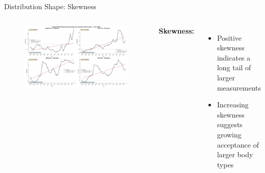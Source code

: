 \documentclass[aspectratio=169,xcolor=dvipsnames,10pt]{beamer}
\begin{document}
\begin{frame}{Distribution Shape: Skewness}
    \begin{columns}
            \begin{figure}
                \includegraphics[width=\textwidth]{figures/skewness_evolution_female_eu_from_2000.png}
            \end{figure}
        \textbf{Skewness:} 
            \begin{itemize}
                \setlength{\itemsep}{0.6em}
                \pause \item Positive skewness indicates a long tail of larger measurements
                \pause \item Increasing skewness suggests growing acceptance of larger body types
            \end{itemize}
      
    \end{columns}
\end{frame}
\end{document}
